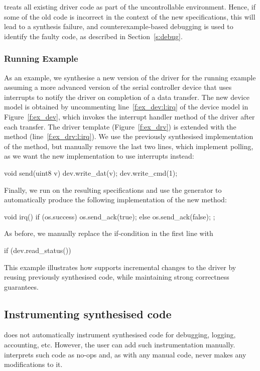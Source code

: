\termite treats all existing driver code as part of the uncontrollable environment.  Hence, if some of the old code is incorrect in the context of the new specifications, this will lead to a synthesis failure, and counterexample-based debugging is used to identify the faulty code, as described in Section~\ref{s:debug}.

\subsubsection{Running Example}

As an example, we synthesise a new version of the driver for the running example assuming a more advanced version of the serial controller device that uses interrupts to notify the driver on completion of a data transfer.  The new device model is obtained by uncommenting line~\ref{f:ex_dev:l:irq} of the device model in Figure~\ref{f:ex_dev}, which invokes the interrupt handler method of the driver after each transfer.  The driver template (Figure~\ref{f:ex_drv}) is extended with the  method (line~\ref{f:ex_drv:l:irq}).  We use the previously synthesised implementation of the  method, but manually remove the last two lines, which implement polling, as we want the new implementation to use interrupts instead:

\begin{tsllisting}
void send(uint8 v){
    dev.write_dat(v);
    dev.write_cmd(1);}
\end{tsllisting}

Finally, we run \termite on the resulting specifications and use the generator to automatically produce the following implementation of the new  method:

\begin{tsllisting}
void irq(){
    if (os.success) {
        os.send_ack(true);
    } else {
        os.send_ack(false);
    };}
\end{tsllisting}

As before, we manually replace the if-condition in the first line with

\begin{tsllisting}
if (dev.read_status())
\end{tsllisting}

This example illustrates how \termite supports incremental changes to the driver by reusing previously synthesised code, while maintaining strong correctness guarantees.

\subsection{Instrumenting synthesised code~~} 
\termite does not automatically instrument synthesised code for debugging, logging, accounting, etc.  However, the user can add such instrumentation manually.  \termite interprets such code as no-ops and, as with any manual code, never makes any modifications to it.

